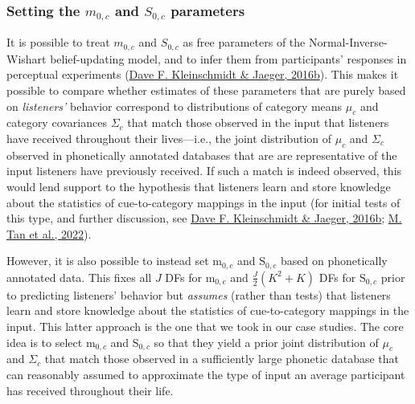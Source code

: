 \documentclass[
  11pt,
  english,
  man,floatsintext]{apa6}
\begin{document}
\hypertarget{setting-the-m_0c-and-s_0c-parameters}{%
\subsubsection{\texorpdfstring{Setting the \(m_{0,c}\) and \(S_{0,c}\) parameters}{Setting the m\_\{0,c\} and S\_\{0,c\} parameters}}\label{setting-the-m_0c-and-s_0c-parameters}}

It is possible to treat \(m_{0,c}\) and \(S_{0,c}\) as free parameters of the Normal-Inverse-Wishart belief-updating model, and to infer them from participants' responses in perceptual experiments (\protect\hyperlink{ref-kleinschmidt-jaeger2016cogsci}{Dave F. Kleinschmidt \& Jaeger, 2016b}). This makes it possible to compare whether estimates of these parameters that are purely based on \emph{listeners'} behavior correspond to distributions of category means \(\mu_c\) and category covariances \(\Sigma_c\) that match those observed in the input that listeners have received throughout their lives---i.e., the joint distribution of \(\mu_c\) and \(\Sigma_c\) observed in phonetically annotated databases that are are representative of the input listeners have previously received. If such a match is indeed observed, this would lend support to the hypothesis that listeners learn and store knowledge about the statistics of cue-to-category mappings in the input (for initial tests of this type, and further discussion, see \protect\hyperlink{ref-kleinschmidt-jaeger2016cogsci}{Dave F. Kleinschmidt \& Jaeger, 2016b}; \protect\hyperlink{ref-tan2022}{M. Tan et al., 2022}).

However, it is also possible to instead set \(\mathrm{m}_{0,c}\) and \(\mathrm{S}_{0,c}\) based on phonetically annotated data. This fixes all \(J\) DFs for \(\mathrm{m}_{0,c}\) and \(\frac{J}{2}(K^2+K)\) DFs for \(\mathrm{S}_{0,c}\) prior to predicting listeners' behavior but \emph{assumes} (rather than tests) that listeners learn and store knowledge about the statistics of cue-to-category mappings in the input. This latter approach is the one that we took in our case studies. The core idea is to select \(\mathrm{m}_{0,c}\) and \(\mathrm{S}_{0,c}\) so that they yield a prior joint distribution of \(\mu_c\) and \(\Sigma_c\) that match those observed in a sufficiently large phonetic database that can reasonably assumed to approximate the type of input an average participant has received throughout their life.
\end{document}
